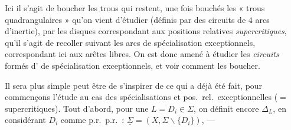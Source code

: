 \documentclass[11pt,a4paper]{article}
\begin{document}
Ici il s'agit de boucher les trous qui restent, \struck{\ill{}} une fois bouchés les « trous quadrangulaires » qu'on vient d'étudier (définis par des circuits de $4$ arcs d'inertie), par les disques correspondant aux positions relatives \emph{supercritiques}, qu'il s'agit de recoller  suivant les arcs de spécialisation exceptionnels, correspondant ici aux arêtes libres. On est donc amené à étudier les \emph{circuits} formés d'  de spécialisation exceptionnels, et voir comment les boucher.

 Il sera plus simple peut être de s'inspirer de ce qui a déjà été fait, pour \uncertain{\ill{}} commençons l'étude au cas des spécialisations et pos.\ rel.\ exceptionnelles ($=$ supercritiques). Tout d'abord, pour une \struck{\ill{}} $L = D_i \in \Sigma$, on définit encore $\Delta_L$, en considérant $D_i$ comme p.r.\ p.r.\ : $\underline{\Sigma} = (X, \Sigma \smallsetminus \lbrace D_i \rbrace)$, ---
\end{document}
